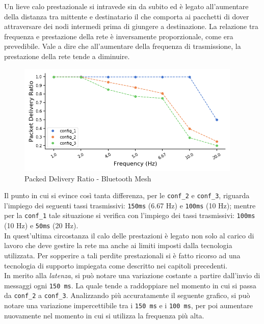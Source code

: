 \noindent Un lieve calo prestazionale si intravede sin da subito ed è legato all'aumentare della distanza tra mittente e destinatario il che comporta ai pacchetti di dover attraversare dei nodi intermedi prima di giungere a destinazione. La relazione tra frequenza e prestazione della rete è inversamente proporzionale, come era prevedibile. Vale a dire che all'aumentare della frequenza di trasmissione, la prestazione della rete tende a diminuire.

\begin{figure}[hbt!]
    \centering
    \includegraphics[width = 0.95\textwidth]{images/graphs/ble_pdr.png}
    \caption{Packed Delivery Ratio - Bluetooth Mesh}
    \label{graph:ble_pdr}
\end{figure}

\noindent Il punto in cui si evince così tanta differenza, per le \texttt{conf\_2} e \texttt{conf\_3}, riguarda l'impiego dei seguenti tassi trasmissivi: \texttt{150ms} (6.67 Hz) e \texttt{100ms} (10 Hz); mentre per la \texttt{conf\_1} tale situazione si verifica con l'impiego dei tassi trasmissivi: \texttt{100ms} (10 Hz) e \texttt{50ms} (20 Hz). \\
In quest'ultima circostanza il calo delle prestazioni è legato non solo al carico di lavoro che deve gestire la rete ma anche ai limiti imposti dalla tecnologia utilizzata. Per sopperire a tali perdite prestazionali si è fatto ricorso ad una tecnologia di supporto impiegata come descritto nei capitoli precedenti.\\

\noindent In merito alla \textit{latenza}, si può notare una variazione costante a partire dall'invio di messaggi ogni \texttt{150 ms}. La quale tende a raddoppiare nel momento in cui si passa da \texttt{conf\_2} a \texttt{conf\_3}. Analizzando più accuratamente il seguente grafico, si può notare una variazione impercettibile tra i \texttt{150 ms} e i \texttt{100 ms}, per poi aumentare nuovamente nel momento in cui si utilizza la frequenza più alta.


